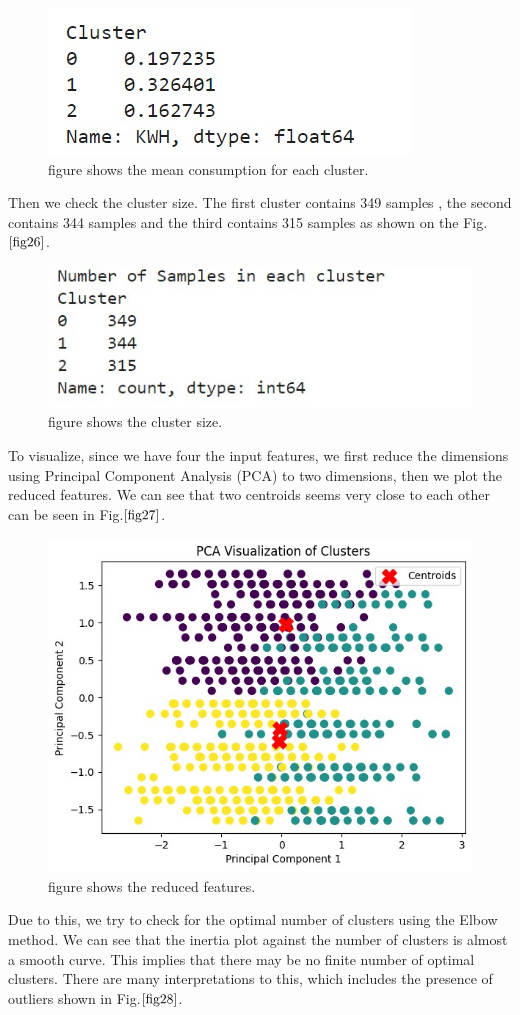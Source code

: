 \documentclass[english,12pt, titlepage]{article}
\begin{document}
	
	\begin{figure}[!ht]
		\centering
		\includegraphics[width=0.5\linewidth]{fig18.jpeg}
		\caption{figure shows the mean consumption for each cluster.}\label{fig25}
	\end{figure}
	
	Then we check the cluster size. The first cluster contains 349 samples , the second contains 344 samples and the third contains 315 samples as shown on the 
	Fig.$\ref{fig26}$.
	
	
	
	\begin{figure}[!ht]
		\centering
		\includegraphics[width=0.5\linewidth]{fig19.jpeg}
		\caption{figure shows the cluster size.}\label{fig26}
	\end{figure}
	
	To visualize, since we have four the input features, we first reduce the dimensions using Principal Component Analysis (PCA) to two dimensions, then we plot the reduced features. We can see that two centroids seems very close to each other can be seen in Fig.$\ref{fig27}$.
	
	
	\begin{figure}[!ht]
		\centering
		\includegraphics[width=0.5\linewidth]{fig20.jpeg}
		\caption{figure shows the reduced features.}\label{fig27}
	\end{figure}
	
	Due to this, we try to check for the optimal number of clusters using the Elbow method. We can see that the inertia plot against the number of clusters is almost a smooth curve. This implies that there may be no finite number of optimal clusters. There are many interpretations to this, which includes the presence of outliers shown in Fig.$\ref{fig28}$.
	
\end{document}
